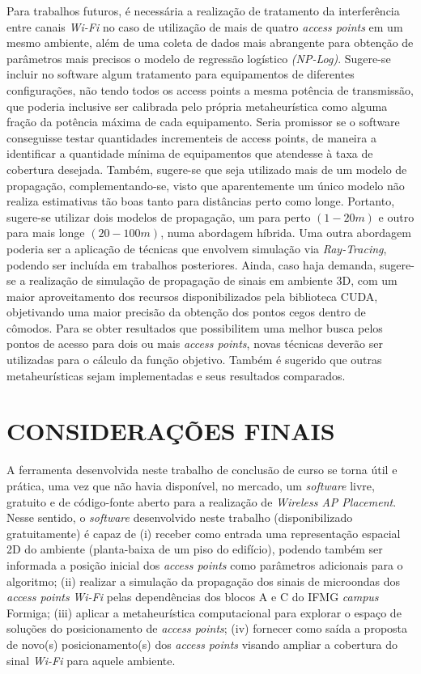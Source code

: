 \documentclass[
	12pt,				%
	twoside,			%
	a4paper,			%
	english,			%
	french,				%
	spanish,			%
	brazil				%
	]{abntex2}
\begin{document}
Para trabalhos futuros, é necessária a realização de tratamento da
interferência entre canais \emph{Wi-Fi} no caso de utilização de mais de
quatro \emph{access points} em um mesmo ambiente, além de uma coleta de
dados mais abrangente para obtenção de parâmetros mais precisos o modelo
de regressão logístico \emph{(NP-Log)}. Sugere-se incluir no software
algum tratamento para equipamentos de diferentes configurações, não
tendo todos os access points a mesma potência de transmissão, que
poderia inclusive ser calibrada pelo própria metaheurística como alguma
fração da potência máxima de cada equipamento. Seria promissor se o
software conseguisse testar quantidades incrementeis de access points,
de maneira a identificar a quantidade mínima de equipamentos que
atendesse à taxa de cobertura desejada. Também, sugere-se que seja
utilizado mais de um modelo de propagação, complementando-se, visto que
aparentemente um único modelo não realiza estimativas tão boas tanto
para distâncias perto como longe. Portanto, sugere-se utilizar dois
modelos de propagação, um para perto \((1-20 m)\) e outro para mais
longe \((20-100 m)\), numa abordagem híbrida. Uma outra abordagem
poderia ser a aplicação de técnicas que envolvem simulação via
\emph{Ray-Tracing}, podendo ser incluída em trabalhos posteriores.
Ainda, caso haja demanda, sugere-se a realização de simulação de
propagação de sinais em ambiente 3D, com um maior aproveitamento dos
recursos disponibilizados pela biblioteca CUDA, objetivando uma maior
precisão da obtenção dos pontos cegos dentro de cômodos. Para se obter
resultados que possibilitem uma melhor busca pelos pontos de acesso para
dois ou mais \emph{access points}, novas técnicas deverão ser utilizadas
para o cálculo da função objetivo. Também é sugerido que outras
metaheurísticas sejam implementadas e seus resultados comparados.

\chapter{CONSIDERAÇÕES FINAIS}\label{sec:consideracoes}

A ferramenta desenvolvida neste trabalho de conclusão de curso se torna
útil e prática, uma vez que não havia disponível, no mercado, um
\emph{software} livre, gratuito e de código-fonte aberto para a
realização de \emph{Wireless AP Placement}. Nesse sentido, o
\emph{software} desenvolvido neste trabalho (disponibilizado
gratuitamente) é capaz de (i) receber como entrada uma representação
espacial 2D do ambiente (planta-baixa de um piso do edifício), podendo
também ser informada a posição inicial dos \emph{access points} como
parâmetros adicionais para o algoritmo; (ii) realizar a simulação da
propagação dos sinais de microondas dos \emph{access points}
\emph{Wi-Fi} pelas dependências dos blocos A e C do IFMG \emph{campus}
Formiga; (iii) aplicar a metaheurística computacional para explorar o
espaço de soluções do posicionamento de \emph{access points}; (iv)
fornecer como saída a proposta de novo(s) posicionamento(s) dos
\emph{access points} visando ampliar a cobertura do sinal \emph{Wi-Fi}
para aquele ambiente.
\end{document}
